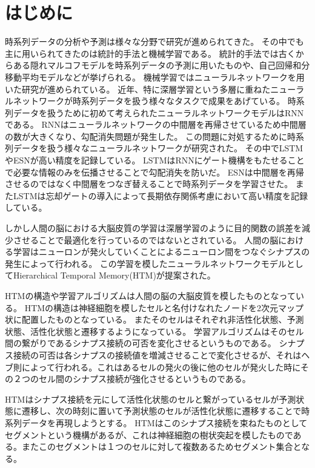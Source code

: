 \chapter{はじめに}
時系列データの分析や予測は様々な分野で研究が進められてきた。
その中でも主に用いられてきたのは統計的手法と機械学習である。
統計的手法では古くからある隠れマルコフモデル\cite{hmm_original}を時系列データの予測に用いたもの\cite{hmm}や、自己回帰和分移動平均モデル\cite{arima}などが挙げられる。
機械学習ではニューラルネットワークを用いた研究が進められている。
近年、特に深層学習という多層に重ねたニューラルネットワークが時系列データを扱う様々なタスクで成果をあげている。
時系列データを扱うために初めて考えられたニューラルネットワークモデルはRNN\cite{rnn}である。
RNNはニューラルネットワークの中間層を再帰させているため中間層の数が大きくなり、勾配消失問題が発生した。
この問題に対処するために時系列データを扱う様々なニューラルネットワークが研究された。
その中でLSTM\cite{lstm_original}やESN\cite{esn}が高い精度を記録している。
LSTMはRNNにゲート機構をもたせることで必要な情報のみを伝播させることで勾配消失を防いだ。
ESNは中間層を再帰させるのではなく中間層をつなぎ替えることで時系列データを学習させた。
またLSTMは忘却ゲートの導入\cite{lstm_forget_gate}によって長期依存関係考慮において高い精度を記録している。

しかし人間の脳における大脳皮質の学習は深層学習のように目的関数の誤差を減少させることで最適化を行っているのではないとされている。\cite{neurons}
人間の脳における学習はニューロンが発火していくことによるニューロン間をつなぐシナプスの発生によって行われる。
この学習を模したニューラルネットワークモデルとしてHierarchical Temporal Memory(HTM)が提案された。\cite{htm}

HTMの構造や学習アルゴリズムは人間の脳の大脳皮質を模したものとなっている。
HTMの構造は神経細胞を模したセルと名付けなれたノードを2次元マップ状に配置したものとなっている。
またそのセルはそれぞれ非活性化状態、予測状態、活性化状態と遷移するようになっている。
学習アルゴリズムはそのセル間の繋がりであるシナプス接続の可否を変化させるというものである。
シナプス接続の可否は各シナプスの接続値を増減させることで変化させるが、それはヘブ則によって行われる。これはあるセルの発火の後に他のセルが発火した時にその２つのセル間のシナプス接続が強化させるというものである。

HTMはシナプス接続を元にして活性化状態のセルと繋がっているセルが予測状態に遷移し、次の時刻に置いて予測状態のセルが活性化状態に遷移することで時系列データを再現しようとする。
HTMはこのシナプス接続を束ねたものとしてセグメントという機構があるが、これは神経細胞の樹状突起を模したものである。またこのセグメントは１つのセルに対して複数あるためセグメント集合となる。

